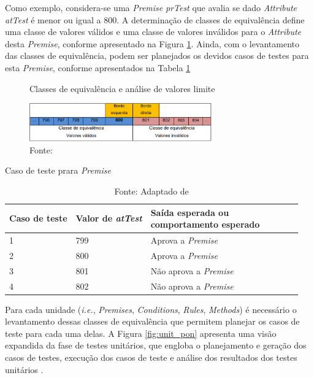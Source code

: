 Como exemplo, considera-se uma \textit{Premise} \textit{prTest} que avalia se
dado \textit{Attribute} \textit{atTest} é menor ou igual a 800. A determinação
de classes de equivalência define uma classe de valores válidos e uma classe de
valores inválidos para o \textit{Attribute} desta \textit{Premise}, conforme
apresentado na Figura \ref{fig:classe_equivalencia}. Ainda, com o levantamento
das classes de equivalência, podem ser planejados os devidos casos de testes
para esta \textit{Premise}, conforme apresentados na Tabela \ref{tab:test_case}

\begin{figure}[!htb]
  \centering
  \caption{Classes de equivalência e análise de valores limite}
  \includegraphics[width=0.7\textwidth]{../figures/classes_equivalencia.png}
  \smallskip
  \caption*{Fonte: }
  \label{fig:classe_equivalencia}
\end{figure}


\begin{table}[!htb]
  \centering
  \caption{Caso de teste prara \textit{Premise}} 
  \smallskip
  \begin{tabularx}{\textwidth}{|l|*{6}{X|}}\hline
    Caso de teste & Valor de \textit{atTest} & \makecell{Saída esperada ou\\ comportamento esperado}    \\\hline
    1 & 799 & Aprova a \textit{Premise} \\ \hline
    2 & 800 & Aprova a \textit{Premise} \\ \hline
    3 & 801 & Não aprova a \textit{Premise} \\ \hline
    4 & 802 & Não aprova a \textit{Premise} \\ \hline
  \end{tabularx}\caption*{Fonte: Adaptado de
  }
\label{tab:test_case}
\end{table}

\FloatBarrier

Para cada unidade (\textit{i.e.}, \textit{Premises}, \textit{Conditions},
\textit{Rules}, \textit{Methods}) é necessário o levantamento dessas classes de
equivalência que permitem planejar os casos de teste para cada uma delas. A
Figura \ref{fig:unit_pon} apresenta uma visão expandida da fase de testes
unitários, que engloba o planejamento e geração dos casos de testes, execução
dos casos de teste e análise dos resultados dos testes unitários
\cite{msc_Kossoski_2015}.

